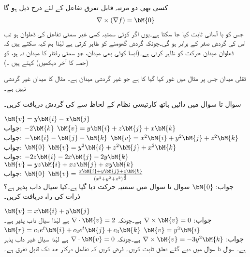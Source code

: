 کسی بھی دو مرتبہ قابل تفرق تفاعل  کے لئے درج ذیل ہو گا
\begin{align}\label{مساوات_خطی_تکمل_ڈھلوان_کی_گردش_صفر}
\nabla \times (\nabla f)=\bM{0}
\end{align}
جس کو با آسانی ثابت کیا جا سکتا ہے۔یوں اگر کوئی سمتیہ کسی غیر سمتی تفاعل کی ڈھلوان ہو تب اس کی گردش صفر کے برابر ہو گی۔چونکہ گردش گھومنے کو ظاہر کرتی ہے لہٰذا ہم کہہ سکتے ہیں کہ ڈھلوان میدان  حرکت کو ظاہر کرتی ہے۔(ایسا کوئی بھی میدان، جو سمتی رفتار کا میدان نہ ہو، کو  (حصہ  کا آخر دیکھیں) کہتے ہیں ۔)

ثقلی میدان جس پر مثال  میں غور کیا گیا کا  ہے جو غیر گردشی میدان ہے۔ مثال  کا میدان غیر گردشی نہیں ہے۔

سوال  تا سوال  میں دائیں ہاتھ کارتیسی نظام کے لحاظ سے  کی گردش دریافت کریں۔

\quad
$\bM{v}=y\bM{i}-x\bM{j}$\\
جواب:
$-2\bM{k}$
\quad
$\bM{v}=y\bM{i}+z\bM{j}+x\bM{k}$\\
جواب:
$-\bM{i}-\bM{j}-\bM{k}$
\quad
$\bM{v}=x^2\bM{i}+y^2\bM{j}+z^2\bM{k}$\\
جواب:
$\bM{0}$
\quad
$\bM{v}=y^2\bM{i}+z^2\bM{j}+x^2\bM{k}$\\
جواب:
$-2z\bM{i}-2x\bM{j}-2y\bM{k}$
\quad
$\bM{v}=yz\bM{i}+xz\bM{j}+xy\bM{k}$\\
جواب:
$\bM{0}$
\quad
$\bM{v}=\frac{x\bM{i}+y\bM{j}+z\bM{k}}{(x^2+y^2+z^2)^{\frac{3}{2}}}$\\
جواب:
$\bM{0}$
سوال  تا سوال  میں سمتیہ حرکت  دیا گیا ہے۔کیا سیال داب پذیر ہے؟ ذرات کی راہ دریافت کریں۔

 \quad
$\bM{v}=x\bM{i}+y\bM{j}$\\
جواب:\quad
$\nabla \times \bM{v}=0$
ہے۔چونکہ 
$\nabla \cdot \bM{v}=2$
ہے لہٰذا سیال داب پذیر ہے۔
$\bM{r}=c_1e^t\bM{i}+c_2e^t\bM{j}+c_3\bM{k}$
\quad
$\bM{v}=y^3\bM{i}$\\
جواب:\quad
$\nabla \times \bM{v}=-3y^2\bM{k}$
ہے۔چونکہ 
$\nabla \cdot \bM{v}=0$
ہے لہٰذا سیال غیر داب پذیر ہے۔
سوال  تا سوال  میں دیے گئے تعلق ثابت کریں۔ فرض کریں کہ تفاعل درکار حد تک قابل تفرق ہے۔


